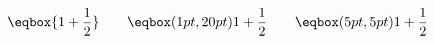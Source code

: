 \[
  \eqbox{1+\dfrac{1}{2}} \qquad
  \eqbox(1pt,20pt){1+\dfrac{1}{2}} \qquad
  \eqbox(5pt,5pt){1+\dfrac{1}{2}}
\]

